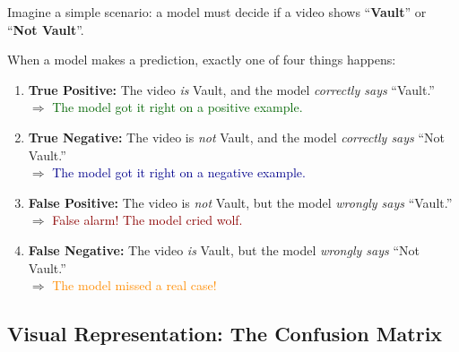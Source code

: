 \documentclass[12pt, a4paper]{article}
\begin{document}
Imagine a simple scenario: a model must decide if a video shows ``\textbf{Vault}'' or ``\textbf{Not Vault}''.

\begin{keyidea}
When a model makes a prediction, exactly one of four things happens:

\begin{enumerate}[leftmargin=2cm, itemsep=0.5cm]
    \item[\textcolor{tp_green}{\textbf{TP}}] \textbf{True Positive:} The video \textit{is} Vault, and the model \textit{correctly says} ``Vault.''\\
    $\Rightarrow$ \textcolor{darkgreen}{The model got it right on a positive example.}

    \item[\textcolor{tn_blue}{\textbf{TN}}] \textbf{True Negative:} The video is \textit{not} Vault, and the model \textit{correctly says} ``Not Vault.''\\
    $\Rightarrow$ \textcolor{darkblue}{The model got it right on a negative example.}

    \item[\textcolor{fp_red}{\textbf{FP}}] \textbf{False Positive:} The video is \textit{not} Vault, but the model \textit{wrongly says} ``Vault.''\\
    $\Rightarrow$ \textcolor{darkred}{False alarm! The model cried wolf.}

    \item[\textcolor{fn_orange}{\textbf{FN}}] \textbf{False Negative:} The video \textit{is} Vault, but the model \textit{wrongly says} ``Not Vault.''\\
    $\Rightarrow$ \textcolor{darkorange}{The model missed a real case!}
\end{enumerate}
\end{keyidea}

\subsection{Visual Representation: The Confusion Matrix}
\end{document}
